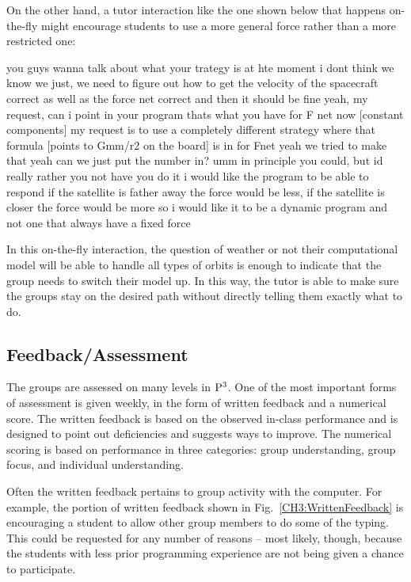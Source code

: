 \documentclass{msuphddissertation}
\begin{document}
\begin{doublespace}
On the other hand, a tutor interaction like the one shown below that happens on-the-fly might encourage students to use a more general force rather than a more restricted one:  \begin{description}\TA  you guys wanna talk about what your trategy is at hte moment
\SB  i dont think we know	
\SA we just, we need to figure out how to get the velocity of the spacecraft correct as well as the force net correct and then it should be fine				
\TA yeah, my request, can i point in your program thats what you have for F net now [constant components] my request is to use a completely different strategy where that formula [points to Gmm/r2 on the board] is in for Fnet
\SC yeah we tried to make that yeah		
\SA can we just put the number in?				
\TA umm in principle you could, but id really rather you not have you do it i would like the program to be able to respond if the satellite is father away the force would be less, if the satellite is closer the force would be more so i would like it to be a dynamic program and not one that always have a fixed force\end{description}  In this on-the-fly interaction, the question of weather or not their computational model will be able to handle all types of orbits is enough to indicate that the group needs to switch their model up.  In this way, the tutor is able to make sure the groups stay on the desired path without directly telling them exactly what to do.

\subsection{Feedback/Assessment}

The groups are assessed on many levels in ${\rm P}^{3}$.  One of the most important forms of assessment is given weekly, in the form of written feedback and a numerical score.  The written feedback is based on the observed in-class performance and is designed to point out deficiencies and suggests ways to improve.  The numerical scoring is based on performance in three categories: group understanding, group focus, and individual understanding.

Often the written feedback pertains to group activity with the computer.  For example, the portion of written feedback shown in Fig.~\ref{CH3:WrittenFeedback} is encouraging a student to allow other group members to do some of the typing.   This could be requested for any number of reasons -- most likely, though, because the students with less prior programming experience are not being given a chance to participate.


\end{doublespace}
\end{document}
